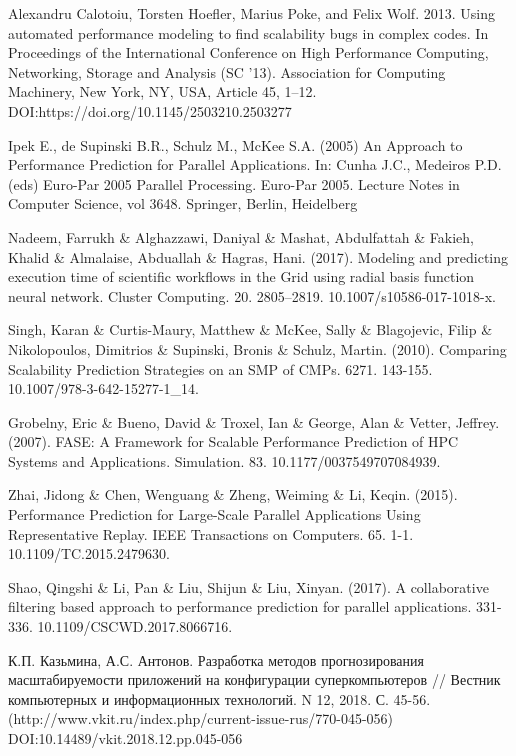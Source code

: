 \begin{thebibliography}{}
			Alexandru Calotoiu, Torsten Hoefler, Marius Poke, and Felix Wolf. 2013. Using automated performance modeling to find scalability bugs in complex codes. In Proceedings of the International Conference on High Performance Computing, Networking, Storage and Analysis (SC ’13). Association for Computing Machinery, New York, NY, USA, Article 45, 1–12. DOI:https://doi.org/10.1145/2503210.2503277

			Ipek E., de Supinski B.R., Schulz M., McKee S.A. (2005) An Approach to Performance Prediction for Parallel Applications. In: Cunha J.C., Medeiros P.D. (eds) Euro-Par 2005 Parallel Processing. Euro-Par 2005. Lecture Notes in Computer Science, vol 3648. Springer, Berlin, Heidelberg

			Nadeem, Farrukh \& Alghazzawi, Daniyal \& Mashat, Abdulfattah \& Fakieh, Khalid \& Almalaise, Abduallah \& Hagras, Hani. (2017). Modeling and predicting execution time of scientific workflows in the Grid using radial basis function neural network. Cluster Computing. 20. 2805–2819. 10.1007/s10586-017-1018-x. 

			Singh, Karan \& Curtis-Maury, Matthew \& McKee, Sally \& Blagojevic, Filip \& Nikolopoulos, Dimitrios \& Supinski, Bronis \& Schulz, Martin. (2010). Comparing Scalability Prediction Strategies on an SMP of CMPs. 6271. 143-155. 10.1007/978-3-642-15277-1\_14.

			Grobelny, Eric \& Bueno, David \& Troxel, Ian \& George, Alan \& Vetter, Jeffrey. (2007). FASE: A Framework for Scalable Performance Prediction of HPC Systems and Applications. Simulation. 83. 10.1177/0037549707084939. 

			Zhai, Jidong \& Chen, Wenguang \& Zheng, Weiming \& Li, Keqin. (2015). Performance Prediction for Large-Scale Parallel Applications Using Representative Replay. IEEE Transactions on Computers. 65. 1-1. 10.1109/TC.2015.2479630. 			

			Shao, Qingshi \& Li, Pan \& Liu, Shijun \& Liu, Xinyan. (2017). A collaborative filtering based approach to performance prediction for parallel applications. 331-336. 10.1109/CSCWD.2017.8066716. 

			К.П. Казьмина, А.С. Антонов. Разработка методов прогнозирования масштабируемости приложений на конфигурации суперкомпьютеров // Вестник компьютерных и информационных технологий. N 12, 2018. С. 45-56.(http://www.vkit.ru/index.php/current-issue-rus/770-045-056) DOI:10.14489/vkit.2018.12.pp.045-056


\end{thebibliography}
